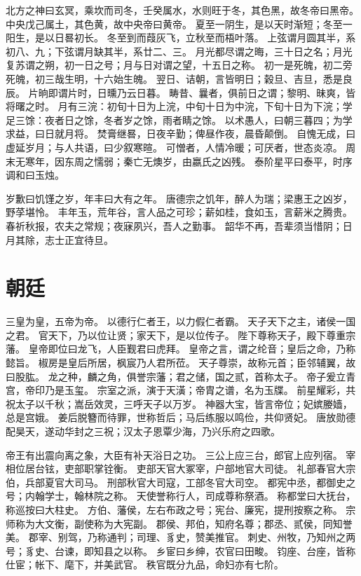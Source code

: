 \documentclass[12pt,UTF8]{ctexbook}
\begin{document}
北方之神曰玄冥，乘坎而司冬，壬癸属水，水则旺于冬，其色黑，故冬帝曰黑帝。
中央戊己属土，其色黄，故中央帝曰黄帝。
夏至一阴生，是以天时渐短；冬至一阳生，是以日晷初长。
冬至到而葭灰飞，立秋至而梧叶落。
上弦谓月圆其半，系初八、九；下弦谓月缺其半，系廿二、三。
月光都尽谓之晦，三十日之名；月光复苏谓之朔，初一日之号；月与日对谓之望，十五日之称。
初一是死魄，初二旁死魄，初三哉生明，十六始生魄。
翌日、诘朝，言皆明日；榖旦、吉旦，悉是良辰。
片晌即谓片时，日曛乃云日暮。
畴昔、曩者，俱前日之谓；黎明、昧爽，皆将曙之时。
月有三浣：初旬十日为上浣，中旬十日为中浣，下旬十日为下浣；学足三馀：夜者日之馀，冬者岁之馀，雨者睛之馀。
以术愚人，曰朝三暮四；为学求益，曰日就月将。
焚膏继晷，日夜辛勤；俾昼作夜，晨昏颠倒。
自愧无成，曰虚延岁月；与人共语，曰少叙寒暄。
可憎者，人情冷暖；可厌者，世态炎凉。
周末无寒年，因东周之懦弱；秦亡无燠岁，由嬴氏之凶残。
泰阶星平曰泰平，时序调和曰玉烛。

岁歉曰饥馑之岁，年丰曰大有之年。
唐德宗之饥年，醉人为瑞；梁惠王之凶岁，野莩堪怜。
丰年玉，荒年谷，言人品之可珍；薪如桂，食如玉，言薪米之腾贵。
春祈秋报，农夫之常规；夜寐夙兴，吾人之勤事。
韶华不再，吾辈须当惜阴；日月其除，志士正宜待旦。

\chapter{朝廷}

三皇为皇，五帝为帝。
以德行仁者王，以力假仁者霸。
天子天下之主，诸侯一国之君。
官天下，乃以位让贤；家天下，是以位传子。
陛下尊称天子，殿下尊重宗藩。
皇帝即位曰龙飞，人臣觐君曰虎拜。
皇帝之言，谓之纶音；皇后之命，乃称懿旨。
椒房是皇后所居，枫宸乃人君所莅。
天子尊崇，故称元首；臣邻辅翼，故曰股肱。
龙之种，麟之角，俱誉宗藩；君之储，国之贰，首称太子。
帝子爰立青宫，帝印乃是玉玺。
宗室之派，演于天潢；帝胄之谱，名为玉牒。
前星耀彩，共祝太子以千秋；嵩岳效灵，三呼天子以万岁。
神器大宝，皆言帝位；妃嫔媵嫱，总是宫娥。
姜后脱簪而待罪，世称哲后；马后练服以鸣俭，共仰贤妃。
唐放勋德配昊天，遂动华封之三祝；汉太子恩覃少海，乃兴乐府之四歌。

帝王有出震向离之象，大臣有补天浴日之功。
三公上应三台，郎官上应列宿。
宰相位居台铉，吏部职掌铨衡。
吏部天官大冢宰，户部地官大司徒。
礼部春官大宗伯，兵部夏官大司马。
刑部秋官大司寇，工部冬官大司空。
都宪中丞，都御史之号；内翰学士，翰林院之称。
天使誉称行人，司成尊称祭酒。
称都堂曰大抚台，称巡按曰大柱史。
方伯、藩侯，左右布政之号；宪台、廉宪，提刑按察之称。
宗师称为大文衡，副使称为大宪副。
郡侯、邦伯，知府名尊；郡丞、贰侯，同知誉美。
郡宰、别驾，乃称通判；司理、豸史，赞美推官。
刺史、州牧，乃知州之两号；豸史、台谏，即知县之以称。
乡宦曰乡绅，农官曰田畯。
钧座、台座，皆称仕宦；帐下、麾下，并美武官。
秩官既分九品，命妇亦有七阶。
\end{document}
